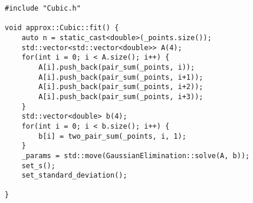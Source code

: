 \begin{lstlisting}
#include "Cubic.h"

void approx::Cubic::fit() {
    auto n = static_cast<double>(_points.size());
    std::vector<std::vector<double>> A(4);
    for(int i = 0; i < A.size(); i++) {
        A[i].push_back(pair_sum(_points, i));
        A[i].push_back(pair_sum(_points, i+1));
        A[i].push_back(pair_sum(_points, i+2));
        A[i].push_back(pair_sum(_points, i+3));
    }
    std::vector<double> b(4);
    for(int i = 0; i < b.size(); i++) {
        b[i] = two_pair_sum(_points, i, 1);
    }
    _params = std::move(GaussianElimination::solve(A, b));
    set_s();
    set_standard_deviation();

}

\end{lstlisting}